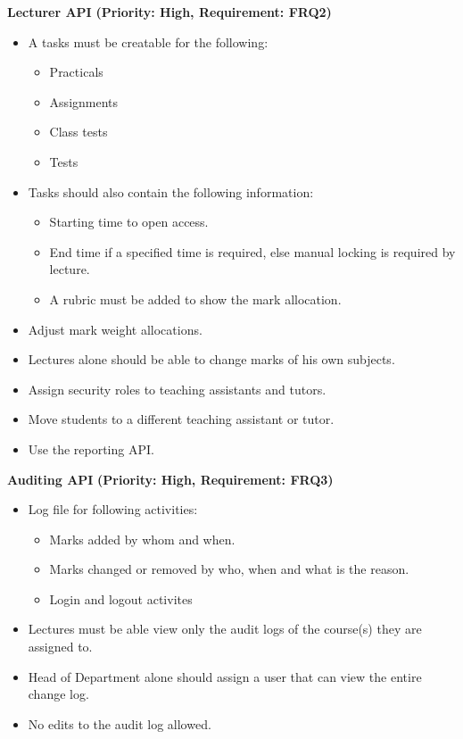 \documentclass[12pt]{article}
\begin{document}
		\textbf{Lecturer API}
		\textbf{(Priority: High, Requirement: FRQ2)}
		\begin{itemize}
			\item A tasks must be creatable for the following:
					\begin{itemize}
						\item Practicals
						\item Assignments
						\item Class tests
						\item Tests
					\end{itemize}
			\item Tasks should also contain the following information:
					\begin{itemize}
						\item Starting time to open access.
						\item End time if a specified time is required, else manual locking is required by lecture.
						\item A rubric must be added to show the mark allocation.
					\end{itemize}
			\item Adjust mark weight allocations.
			\item Lectures alone should be able to change marks of his own subjects.
			\item Assign security roles to teaching assistants and tutors.
			\item Move students to a different teaching assistant or tutor.
			\item Use the reporting API.
		\end{itemize}
		
		\vspace{0.15in}
		
		\textbf{Auditing API}
		\textbf{(Priority: High, Requirement: FRQ3)}
		\begin{itemize}
			\item Log file for following activities:
					\begin{itemize}
					 	\item Marks added by whom and when.
					 	\item Marks changed or removed by who, when and what is the reason.
					 	\item Login and logout activites
					\end{itemize}

			\item Lectures must be able view only the audit logs of the course(s) they are assigned to.
			\item Head of Department alone should assign a user that can view the entire change log.
			\item No edits to the audit log allowed.
		\end{itemize}
		
\end{document}
